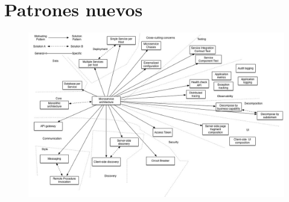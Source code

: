 \documentclass[aspectratio=169]{beamer}
\begin{document}
{
    \section{Patrones nuevos}
}



\begin{frame}{}
\begin{figure}
	\centering
	\includegraphics[width=\linewidth]{Images/PatternsRelatedToMicroservices}
\end{figure}
\end{frame}
\end{document}

